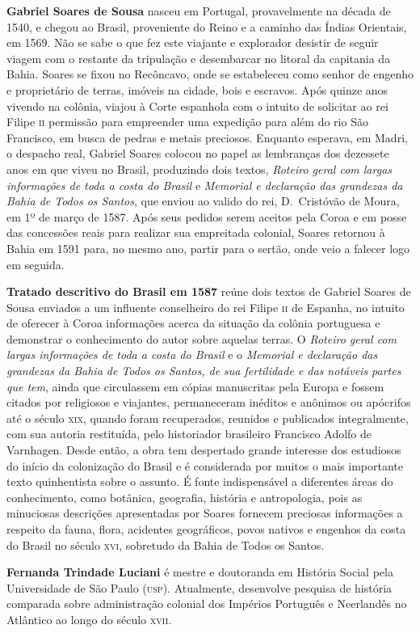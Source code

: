 
\textbf{Gabriel Soares de Sousa} nasceu em Portugal, provavelmente na
década de 1540, e chegou ao Brasil, proveniente do Reino e a caminho das
Índias Orientais, em 1569. Não se sabe o que fez este viajante e
explorador desistir de seguir viagem com o restante da tripulação e
desembarcar no litoral da capitania da Bahia. Soares se fixou no
Recôncavo, onde se estabeleceu como senhor de engenho e proprietário
de terras, imóveis na cidade, bois e escravos. Após quinze anos vivendo
na colônia, viajou à Corte espanhola com o intuito de solicitar ao rei
Filipe \textsc{ii} permissão para empreender uma expedição para além do rio São
Francisco, em busca de pedras e metais preciosos. Enquanto esperava, em
Madri, o despacho real, Gabriel Soares colocou no papel as lembranças
dos dezessete anos em que viveu no Brasil, produzindo dois
textos, \textit{Roteiro geral com largas informações de toda a costa do
Brasil} e \textit{Memorial e declaração das grandezas da Bahia de Todos
os Santos}, que enviou ao valido do rei, D.~Cristóvão de Moura, em 1º
de março de 1587. Após seus pedidos serem aceitos pela Coroa e em posse
das concessões reais para realizar sua empreitada colonial, Soares
retornou à Bahia em 1591 para, no mesmo ano, partir para o sertão, onde
veio a falecer logo em seguida.
     
\textbf{Tratado descritivo do Brasil em 1587} reúne dois textos de
Gabriel Soares de Sousa enviados a um influente conselheiro do rei
Filipe \textsc{ii} de Espanha, no intuito de oferecer à Coroa informações acerca
da situação da colônia portuguesa e demonstrar o conhecimento do autor
sobre aquelas terras.  O \textit{Roteiro geral com largas informações
de toda a costa do Brasil} e o \textit{Memorial e declaração das
grandezas da Bahia de Todos os Santos, de sua fertilidade e das
notáveis partes que tem}, ainda que circulassem em cópias manuscritas
pela Europa e fossem citados por religiosos e viajantes, permaneceram
inéditos e anônimos ou apócrifos até o século \textsc{xix}, quando foram
recuperados, reunidos e publicados integralmente, com sua autoria
restituída, pelo historiador brasileiro Francisco Adolfo de Varnhagen.
Desde então, a obra tem despertado grande interesse dos estudiosos do
início da colonização do Brasil e é considerada por muitos o mais
importante texto quinhentista sobre o assunto. É fonte indispensável a
diferentes áreas do conhecimento, como botânica, geografia, história e
antropologia, pois as minuciosas descrições apresentadas por Soares
fornecem preciosas informações a respeito da fauna, flora, acidentes
geográficos, povos nativos e engenhos da costa do Brasil no
século \textsc{xvi}, sobretudo da Bahia de Todos os Santos.
  
\textbf{Fernanda Trindade Luciani} é mestre e doutoranda em História
Social pela Universidade de São Paulo (\textsc{usp}). Atualmente, desenvolve
pesquisa de história comparada sobre administração colonial dos
Impérios Português e Neerlandês no Atlântico ao longo do século \textsc{xvii}.


